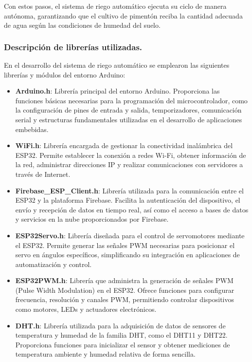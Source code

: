 \documentclass[conference]{IEEEtran}
\begin{document}
Con estos pasos, el sistema de riego automático ejecuta su ciclo de manera autónoma, garantizando que el cultivo de pimentón reciba la cantidad adecuada de agua según las condiciones de humedad del suelo.

\subsubsection{Descripción de librerías utilizadas.}
En el desarrollo del sistema de riego automático se emplearon las siguientes librerías y módulos del entorno Arduino:

\begin{itemize}

\item \textbf{Arduino.h}: Librería principal del entorno Arduino. Proporciona las funciones básicas necesarias para la programación del microcontrolador, como la configuración de pines de entrada y salida, temporizadores, comunicación serial y estructuras fundamentales utilizadas en el desarrollo de aplicaciones embebidas.

\item \textbf{WiFi.h}: Librería encargada de gestionar la conectividad inalámbrica del ESP32. Permite establecer la conexión a redes Wi-Fi, obtener información de la red, administrar direcciones IP y realizar comunicaciones con servidores a través de Internet.

\item \textbf{Firebase\_ESP\_Client.h}: Librería utilizada para la comunicación entre el ESP32 y la plataforma Firebase. Facilita la autenticación del dispositivo, el envío y recepción de datos en tiempo real, así como el acceso a bases de datos y servicios en la nube proporcionados por Firebase.

\item \textbf{ESP32Servo.h}: Librería diseñada para el control de servomotores mediante el ESP32. Permite generar las señales PWM necesarias para posicionar el servo en ángulos específicos, simplificando su integración en aplicaciones de automatización y control.

\item \textbf{ESP32PWM.h}: Librería que administra la generación de señales PWM (Pulse Width Modulation) en el ESP32. Ofrece funciones para configurar frecuencia, resolución y canales PWM, permitiendo controlar dispositivos como motores, LEDs y actuadores electrónicos.

\item \textbf{DHT.h}: Librería utilizada para la adquisición de datos de sensores de temperatura y humedad de la familia DHT, como el DHT11 y DHT22. Proporciona funciones para inicializar el sensor y obtener mediciones de temperatura ambiente y humedad relativa de forma sencilla.

\end{itemize}
\end{document}
